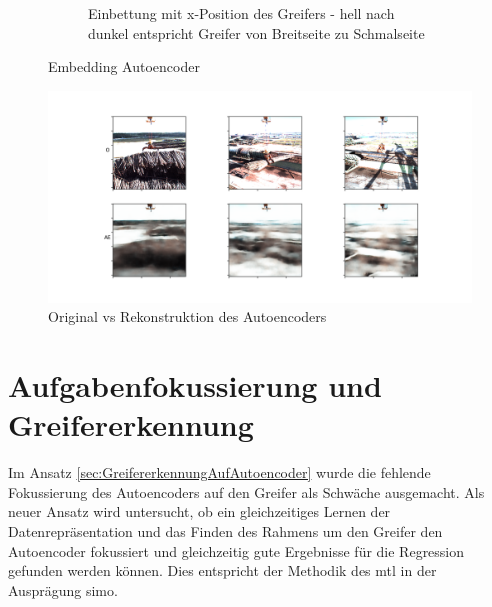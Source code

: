 \begin{figure}[h]
\begin{subfigure}[c]{0.49\textwidth}
			\caption{Einbettung mit x-Position des Greifers - hell nach dunkel entspricht Greifer von Breitseite zu Schmalseite}
			\label{img:Emb_x_AE}	
		\end{subfigure}
		\caption{Embedding Autoencoder}
		\label{img:EmbeddingAE_V}
	\end{figure}
	
	\begin{figure}[h]
		\centering
		\includegraphics[width=1\textwidth, center]{bilder/Hauptteil/Autoencoder_Grappel_Detection/OriginalPicturesAndReconstruction.png}
		\caption{Original vs Rekonstruktion des Autoencoders}
		\label{img:RekonstruktionAE}
	\end{figure}  
	
	\section{Aufgabenfokussierung und Greifererkennung}
	\label{sec:MultiTaskGreifererkennung}
	Im Ansatz \ref{sec:GreifererkennungAufAutoencoder} wurde die fehlende Fokussierung des Autoencoders auf den Greifer als Schwäche ausgemacht. Als neuer Ansatz wird untersucht, ob ein gleichzeitiges Lernen der Datenrepräsentation und das Finden des Rahmens um den Greifer den Autoencoder fokussiert und gleichzeitig gute Ergebnisse für die Regression gefunden werden können. Dies entspricht der Methodik des \ac{mtl} in der Ausprägung \ac{simo}.
	
